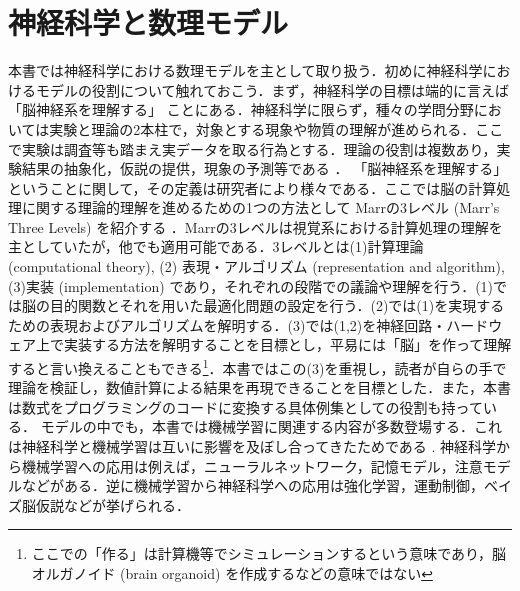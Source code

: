 \section{神経科学と数理モデル
}
本書では神経科学における数理モデルを主として取り扱う．初めに神経科学におけるモデルの役割について触れておこう．まず，神経科学の目標は端的に言えば「脳神経系を理解する」
ことにある．神経科学に限らず，種々の学問分野においては実験と理論の2本柱で，対象とする現象や物質の理解が進められる．ここで実験は調査等も踏まえ実データを取る行為とする．理論の役割は複数あり，実験結果の抽象化，仮説の提供，現象の予測等である \citep{Blohm2020-vc}．
「脳神経系を理解する」ということに関して，その定義は研究者により様々である．ここでは脳の計算処理に関する理論的理解を進めるための1つの方法として Marrの3レベル (Marr's Three Levels) を紹介する \citep{Marr1982-wk}．Marrの3レベルは視覚系における計算処理の理解を主としていたが，他でも適用可能である．3レベルとは(1)計算理論 (computational theory), (2) 表現・アルゴリズム (representation and algorithm), (3)実装 (implementation) であり，それぞれの段階での議論や理解を行う．(1)では脳の目的関数とそれを用いた最適化問題の設定を行う．(2)では(1)を実現するための表現およびアルゴリズムを解明する．(3)では(1,2)を神経回路・ハードウェア上で実装する方法を解明することを目標とし，平易には「脳」を作って理解すると言い換えることもできる\footnote{ここでの「作る」は計算機等でシミュレーションするという意味であり，脳オルガノイド (brain organoid) を作成するなどの意味ではない}．本書ではこの(3)を重視し，読者が自らの手で理論を検証し，数値計算による結果を再現できることを目標とした．また，本書は数式をプログラミングのコードに変換する具体例集としての役割も持っている．
モデルの中でも，本書では機械学習に関連する内容が多数登場する．これは神経科学と機械学習は互いに影響を及ぼし合ってきたためである \citep{Hassabis2017-zm}. 
神経科学から機械学習への応用は例えば，ニューラルネットワーク，記憶モデル，注意モデルなどがある．逆に機械学習から神経科学への応用は強化学習，運動制御，ベイズ脳仮説などが挙げられる．

